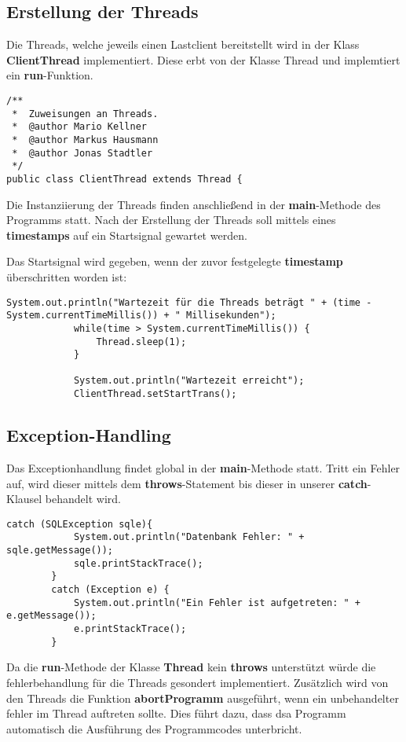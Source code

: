 \subsection{Erstellung der Threads}

Die Threads, welche jeweils einen Lastclient bereitstellt wird in der Klass
\textbf{ClientThread} implementiert. Diese erbt von der Klasse Thread und
implemtiert ein \textbf{run}-Funktion.

\begin{lstlisting}[caption={Ausschnitt aus ClientThread}]
/**
 *  Zuweisungen an Threads.
 *  @author Mario Kellner
 *	@author Markus Hausmann
 *  @author Jonas Stadtler
 */
public class ClientThread extends Thread {
\end{lstlisting}

Die Instanziierung der Threads finden anschließend in der
\textbf{main}-Methode des Programms statt. Nach der Erstellung der Threads
soll mittels eines \textbf{timestamps} auf ein Startsignal gewartet werden.


Das Startsignal wird gegeben, wenn der zuvor festgelegte \textbf{timestamp}
überschritten worden ist:

\begin{lstlisting}[caption={Wartezeit}]
		    System.out.println("Wartezeit für die Threads beträgt " + (time - System.currentTimeMillis()) + " Millisekunden");
		    while(time > System.currentTimeMillis()) {
		    	Thread.sleep(1);
		    }
		    
		    System.out.println("Wartezeit erreicht");
		    ClientThread.setStartTrans();
\end{lstlisting}


\subsection{Exception-Handling}

Das Exceptionhandlung findet global in der \textbf{main}-Methode statt. Tritt
ein Fehler auf, wird dieser mittels dem \textbf{throws}-Statement
 bis dieser in unserer \textbf{catch}-Klausel behandelt wird.

\begin{lstlisting}[caption={Catch-Block}]
		catch (SQLException sqle){
			System.out.println("Datenbank Fehler: " + sqle.getMessage());
			sqle.printStackTrace();
		}
 		catch (Exception e) {
			System.out.println("Ein Fehler ist aufgetreten: " + e.getMessage());
			e.printStackTrace();
		}
\end{lstlisting}

Da die \textbf{run}-Methode der Klasse \textbf{Thread} kein \textbf{throws}
unterstützt würde die fehlerbehandlung für die Threads gesondert implementiert.
Zusätzlich wird von den Threads die Funktion \textbf{abortProgramm}
ausgeführt, wenn ein unbehandelter fehler im Thread auftreten sollte. Dies führt
dazu, dass dsa Programm automatisch die Ausführung des Programmcodes
unterbricht.

\clearpage